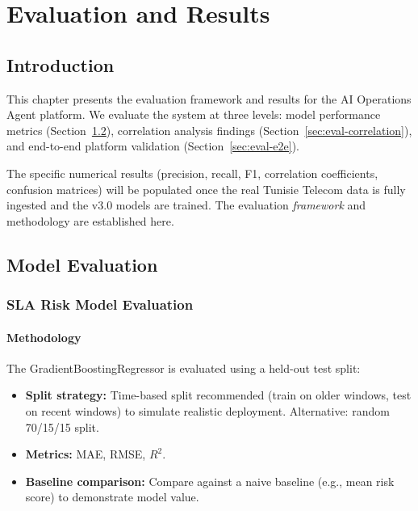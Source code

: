\chapter{Evaluation and Results}
\label{ch:evaluation}

\section{Introduction}

This chapter presents the evaluation framework and results for the AI Operations Agent platform. We evaluate the system at three levels: model performance metrics (Section~\ref{sec:eval-models}), correlation analysis findings (Section~\ref{sec:eval-correlation}), and end-to-end platform validation (Section~\ref{sec:eval-e2e}).

The specific numerical results (precision, recall, F1, correlation coefficients, confusion matrices) will be populated once the real Tunisie Telecom data is fully ingested and the v3.0 models are trained. The evaluation \emph{framework} and methodology are established here.

\section{Model Evaluation}
\label{sec:eval-models}

\subsection{SLA Risk Model Evaluation}

\subsubsection{Methodology}

The GradientBoostingRegressor is evaluated using a held-out test split:

\begin{itemize}
  \item \textbf{Split strategy:} Time-based split recommended (train on older windows, test on recent windows) to simulate realistic deployment. Alternative: random 70/15/15 split.
  \item \textbf{Metrics:} MAE, RMSE, $R^2$.
  \item \textbf{Baseline comparison:} Compare against a naive baseline (e.g., mean risk score) to demonstrate model value.
\end{itemize}

